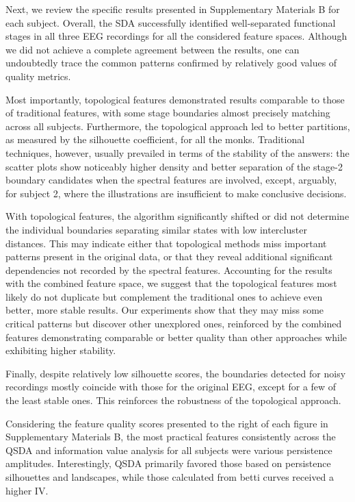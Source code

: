 \documentclass[journal,twoside,web]{ieeecolor2}
\begin{document}
Next, we review the specific results presented in Supplementary Materials B for each subject. Overall, the SDA successfully identified well-separated functional stages in all three EEG recordings for all the considered feature spaces. Although we did not achieve a complete agreement between the results, one can undoubtedly trace the common patterns confirmed by relatively good values of quality metrics.

Most importantly, topological features demonstrated results comparable to those of traditional features, with some stage boundaries almost precisely matching across all subjects. Furthermore, the topological approach led to better partitions, as measured by the silhouette coefficient, for all the monks. Traditional techniques, however, usually prevailed in terms of the stability of the answers: the scatter plots show noticeably higher density and better separation of the stage\mbox{-}2 boundary candidates when the spectral features are involved, except, arguably, for subject 2, where the illustrations are insufficient to make conclusive decisions.

With topological features, the algorithm significantly shifted or did not determine the individual boundaries separating similar states with low intercluster distances. This may indicate either that topological methods miss important patterns present in the original data, or that they reveal additional significant dependencies not recorded by the spectral features. Accounting for the results with the combined feature space, we suggest that the topological features most likely do not duplicate but complement the traditional ones to achieve even better, more stable results. Our experiments show that they may miss some critical patterns but discover other unexplored ones, reinforced by the combined features demonstrating comparable or better quality than other approaches while exhibiting higher stability. 

Finally, despite relatively low silhouette scores, the boundaries detected for noisy recordings mostly coincide with those for the original EEG, except for a few of the least stable ones. This reinforces the robustness of the topological approach.

Considering the feature quality scores presented to the right of each figure in Supplementary Materials B, the most practical features consistently across the QSDA and information value analysis for all subjects were various persistence amplitudes. Interestingly, QSDA primarily favored those based on persistence silhouettes and landscapes, while those calculated from betti curves received a higher IV.\@
\end{document}
